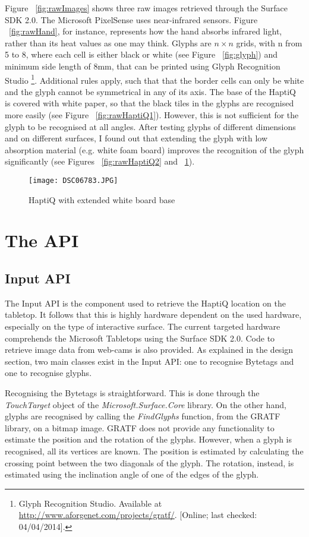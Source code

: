 Figure ~\ref{fig:rawImages} shows three raw images retrieved through the Surface SDK 2.0. The Microsoft PixelSense uses near-infrared sensors. Figure ~\ref{fig:rawHand}, for instance, represents how the hand absorbs infrared light, rather than its heat values as one may think. Glyphs are $n \times n$ grids, with n from 5 to 8, where each cell is either black or white (see Figure  ~\ref{fig:glyph}) and minimum side length of 8mm, that can be printed using Glyph Recognition Studio \footnote{Glyph Recognition Studio. Available at \url{http://www.aforgenet.com/projects/gratf/}. [Online; last checked: 04/04/2014].}. Additional rules apply, such that that the border cells can only be white and the glyph cannot be symmetrical in any of its axis. The base of the HaptiQ is covered with white paper, so that the black tiles in the glyphs are recognised more easily (see Figure ~\ref{fig:rawHaptiQ1}). However, this is not sufficient for the glyph to be recognised at all angles. After testing glyphs of different dimensions and on different surfaces, I found out that extending the glyph with low absorption material (e.g. white foam board) improves the recognition of the glyph significantly (see Figures ~\ref{fig:rawHaptiQ2} and ~\ref{fig:whitesurface}).   

\begin{figure}[H]
  \centering
  \texttt{[image: DSC06783.JPG]}
  \caption{HaptiQ with extended white board base}
  \label{fig:whitesurface}
\end{figure}

\section{The API}

\subsection{Input API}

The Input API is the component used to retrieve the HaptiQ location on the tabletop. It follows that this is highly hardware dependent on the used hardware, especially on the type of interactive surface. The current targeted hardware comprehends the Microsoft Tabletops using the Surface SDK 2.0. Code to retrieve image data from web-cams is also provided. 
As explained in the design section, two main classes exist in the Input API: one to recognise Bytetags and one to recognise glyphs.

Recognising the Bytetags is straightforward. This is done through the \textit{TouchTarget} object of the \textit{Microsoft.Surface.Core} library. On the other hand, glyphs are recognised by calling the \textit{FindGlyphs} function, from the GRATF library, on a bitmap image. GRATF does not provide any functionality to estimate the position and the rotation of the glyphs. However, when a glyph is recognised, all its vertices are known. The position is estimated by calculating the crossing point between the two diagonals of the glyph. The rotation, instead, is estimated using the inclination angle of one of the edges of the glyph. 

